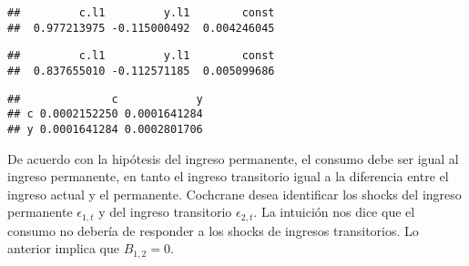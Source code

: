 \documentclass[
]{book}
\newenvironment{Shaded}{\begin{snugshade}}{\end{snugshade}}
\newcommand{\AttributeTok}[1]{\textcolor[rgb]{0.77,0.63,0.00}{#1}}
\newcommand{\ConstantTok}[1]{\textcolor[rgb]{0.00,0.00,0.00}{#1}}
\newcommand{\DecValTok}[1]{\textcolor[rgb]{0.00,0.00,0.81}{#1}}
\newcommand{\FunctionTok}[1]{\textcolor[rgb]{0.00,0.00,0.00}{#1}}
\newcommand{\NormalTok}[1]{#1}
\newcommand{\OtherTok}[1]{\textcolor[rgb]{0.56,0.35,0.01}{#1}}
\newcommand{\SpecialCharTok}[1]{\textcolor[rgb]{0.00,0.00,0.00}{#1}}
\newcommand{\StringTok}[1]{\textcolor[rgb]{0.31,0.60,0.02}{#1}}
\begin{document}
\begin{verbatim}
##         c.l1         y.l1        const 
##  0.977213975 -0.115000492  0.004246045
\end{verbatim}

\begin{Shaded}
\end{Shaded}

\begin{verbatim}
##         c.l1         y.l1        const 
##  0.837655010 -0.112571185  0.005099686
\end{verbatim}

\begin{Shaded}
\end{Shaded}

\begin{verbatim}
##              c            y
## c 0.0002152250 0.0001641284
## y 0.0001641284 0.0002801706
\end{verbatim}

De acuerdo con la hipótesis del ingreso permanente, el consumo debe ser igual al ingreso permanente, en tanto el ingreso transitorio igual a la diferencia entre el ingreso actual y el permanente. Cochcrane desea identificar los shocks del ingreso permanente \(\epsilon_{1,t}\) y del ingreso transitorio \(\epsilon_{2,t}\). La intuición nos dice que el consumo no debería de responder a los shocks de ingresos transitorios. Lo anterior implica que \(B_{1,2}=0\).

\begin{Shaded}
\end{Shaded}
\end{document}
